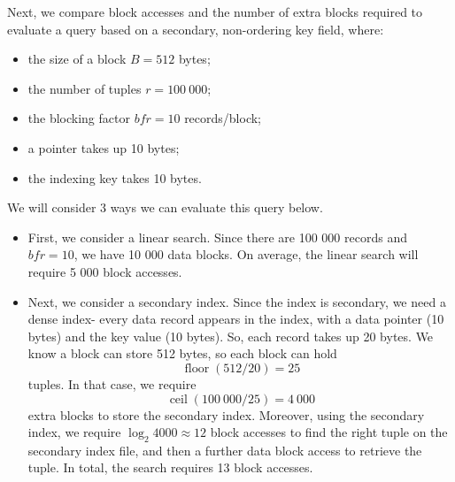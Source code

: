 \documentclass[a4paper, openany]{memoir}
\begin{document}
Next, we compare block accesses and the number of extra blocks required to evaluate a query based on a secondary, non-ordering key field, where:
\begin{itemize}
    \item the size of a block $B = 512$ bytes;
    \item the number of tuples $r = 100 \ 000$;
    \item the blocking factor $\textit{bfr} = 10$ records/block;
    \item a pointer takes up 10 bytes;
    \item the indexing key takes 10 bytes.
\end{itemize}
We will consider 3 ways we can evaluate this query below.
\begin{itemize}
    \item First, we consider a linear search. Since there are 100 000 records and $\textit{bfr} = 10$, we have 10 000 data blocks. On average, the linear search will require 5 000 block accesses.
    
    \item Next, we consider a secondary index. Since the index is secondary, we need a dense index- every data record appears in the index, with a data pointer (10 bytes) and the key value (10 bytes). So, each record takes up 20 bytes. We know a block can store 512 bytes, so each block can hold
    \[\operatorname{floor}(512/20) = 25\]
    tuples. In that case, we require
    \[\operatorname{ceil}(100 \ 000/25) = 4 \ 000\]
    extra blocks to store the secondary index. Moreover, using the secondary index, we require $\log_2 4000 \approx 12$ block accesses to find the right tuple on the secondary index file, and then a further data block access to retrieve the tuple. In total, the search requires 13 block accesses. 
    

\end{itemize}
\end{document}
